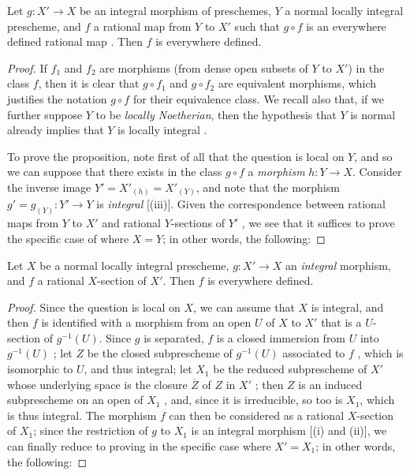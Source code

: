 \begin{proposition}[6.1.13]
\label{II.6.1.13}
Let $g:X'\to X$ be an integral morphism of preschemes, $Y$ a normal locally integral prescheme, and $f$ a rational map from $Y$ to $X'$ such that $g\circ f$ is an everywhere defined rational map .
Then $f$ is everywhere defined.
\end{proposition}

\begin{proof}
If $f_1$ and $f_2$ are morphisms (from dense open subsets of $Y$ to $X'$) in the class $f$, then it is clear that $g\circ f_1$ and $g\circ f_2$ are equivalent morphisms, which justifies the notation $g\circ f$ for their equivalence class.
We recall also that, if we further suppose $Y$ to be \emph{locally Noetherian}, then the hypothesis that $Y$ is normal already implies that $Y$ is locally integral .

To prove the proposition, note first of all that the question is local on $Y$, and so we can suppose that there exists in the class $g\circ f$ a \emph{morphism} $h:Y\to X$.
Consider the inverse image $Y'=X'_{(h)}=X'_{(Y)}$, and note that the morphism $g'=g_{(Y)}:Y'\to Y$ is \emph{integral} [(iii)].
Given the correspondence between rational maps from $Y$ to $X'$ and rational $Y$-sections of $Y'$ , we see that it suffices to prove the specific case of  where $X=Y$; in other words, the following:
\end{proof}

\begin{corollary}[6.1.14]
\label{II.6.1.14}
Let $X$ be a normal locally integral prescheme, $g:X'\to X$ an \emph{integral} morphism, and $f$ a rational $X$-section of $X'$.
Then $f$ is everywhere defined.
\end{corollary}

\begin{proof}
Since the question is local on $X$, we can assume that $X$ is integral, and then $f$ is identified with a morphism from an open $U$ of $X$ to $X'$  that is a $U$-section of $g^{-1}(U)$.
Since $g$ is separated, $f$ is a closed immersion from $U$ into $g^{-1}(U)$ ;
let $Z$ be the closed subprescheme of $g^{-1}(U)$ associated to $f$ , which is isomorphic to $U$, and thus integral;
let $X_1$ be the reduced subprescheme of $X'$ whose underlying space is the closure $\overline{Z}$ of $Z$ in $X'$ ;
then $Z$ is an induced subprescheme on an open of $X_1$ , and, since it is irreducible, so too is $X_1$, which is thus integral.
The morphism $f$ can then be considered as a rational $X$-section of $X_1$;
since the restriction of $g$ to $X_1$ is an integral morphism [(i) and (ii)], we can finally reduce to proving  in the specific case where $X'=X_1$;
in other words, the following:
\end{proof}

